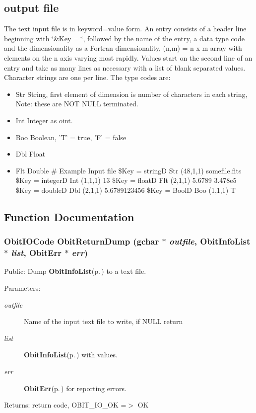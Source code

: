 \subsection{output file}\label{ObitReturn_8h_output_file}
The text input file is in keyword=value form. An entry consists of a header line beginning with \char`\"{}\&Key = \char`\"{}, followed by the name of the entry, a data type code and the dimensionality as a Fortran dimensionality, (n,m) = n x m array with elements on the n axis varying most rapidly. Values start on the second line of an entry and take as many lines as necessary with a list of blank separated values. Character strings are one per line. The type codes are: \begin{itemize}
\item Str String, first element of dimension is number of characters in each string, Note: these are NOT NULL terminated. \item Int Integer as oint. \item Boo Boolean, 'T' = true, 'F' = false \item Dbl Float \item Flt Double \# Example Input file \$Key = string\-D Str (48,1,1) somefile.fits \$Key = integer\-D Int (1,1,1) 13 \$Key = float\-D Flt (2,1,1) 5.6789 3.478e5 \$Key = double\-D Dbl (2,1,1) 5.6789123456 \$Key = Bool\-D Boo (1,1,1) T\end{itemize}


\subsection{Function Documentation}
\subsubsection{\setlength{\rightskip}{0pt plus 5cm}Obit\-IOCode Obit\-Return\-Dump (gchar $\ast$ {\em outfile}, {\bf Obit\-Info\-List} $\ast$ {\em list}, {\bf Obit\-Err} $\ast$ {\em err})}\label{ObitReturn_8h_a1}


Public: Dump {\bf Obit\-Info\-List}{\rm (p.\,\pageref{structObitInfoList})} to a text file. 

\begin{Desc}
\item[Parameters:]
\begin{description}
\item[{\em outfile}]Name of the input text file to write, if NULL return \item[{\em list}]{\bf Obit\-Info\-List}{\rm (p.\,\pageref{structObitInfoList})} with values. \item[{\em err}]{\bf Obit\-Err}{\rm (p.\,\pageref{structObitErr})} for reporting errors. \end{description}
\end{Desc}
\begin{Desc}
\item[Returns:]return code, OBIT\_\-IO\_\-OK =$>$ OK \end{Desc}

